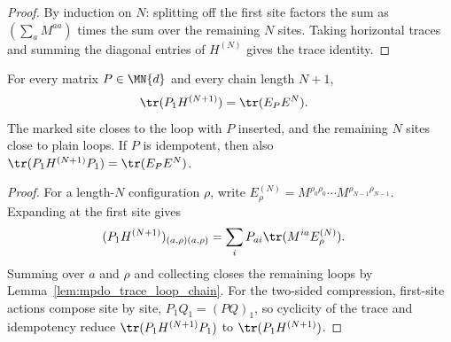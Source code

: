 \begin{proof}\leanok
    By induction on $N$: splitting off the first site factors the sum as
    $(\sum_a M^{aa})$ times the sum over the remaining $N$
    sites. Taking horizontal traces and summing the diagonal entries of
    $H^{(N)}$ gives the trace identity.
\end{proof}

\begin{lemma}
    \label{thm:mpdo_first_site_compression_trace}
    \leanok
    For every matrix $P\in\MN{d}$ and every chain length $N+1$,
    \begin{align}
        \tr(P_1H^{(N+1)})
         & =\tr(E_P E^N).
        \label{eq:mpdo_first_site_trace}
    \end{align}
    The marked site closes to the loop with $P$ inserted, and the remaining
    $N$ sites close to plain loops. If $P$ is idempotent, then also
    $\tr(P_1H^{(N+1)}P_1)=\tr(E_P E^N)$.
\end{lemma}

\begin{proof}\leanok
    For a length-$N$ configuration $\rho$, write
    $E_\rho^{(N)}=M^{\rho_0\rho_0}\cdots M^{\rho_{N-1}\rho_{N-1}}$.
    Expanding at the first site gives
    \begin{align}
        (P_1H^{(N+1)})_{(a,\rho)(a,\rho)}
         & =\sum_i P_{ai} \tr(M^{ia}E_\rho^{(N)}).
        \notag
    \end{align}
    Summing over $a$ and $\rho$ and collecting closes the remaining loops
    by Lemma~\ref{lem:mpdo_trace_loop_chain}. For the
    two-sided compression, first-site actions compose site by site,
    $P_1Q_1=(PQ)_1$, so cyclicity of the trace and idempotency reduce
    $\tr(P_1H^{(N+1)}P_1)$ to $\tr(P_1H^{(N+1)})$.
\end{proof}

